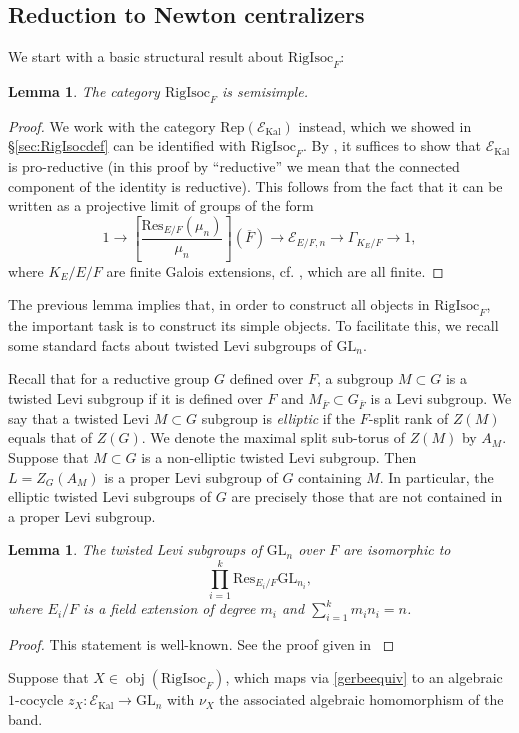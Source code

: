 \documentclass[11pt]{amsart}
\newtheorem{lem}[thm]{Lemma}
\theoremstyle{definition}
\newcommand{\mc}{\mathcal}
\newcommand{\ov}{\overline}
\newcommand{\Res}{\mathrm{Res}}
\newcommand{\RigIsoc}{\mathrm{RigIsoc}}
\newcommand{\GL}{\mathrm{GL}}
\DeclareMathOperator{\Kal}{Kal}
\DeclareMathOperator{\Ob}{obj}
\begin{document}
\subsection{Reduction to Newton centralizers}
We start with a basic structural result about $\RigIsoc_{F}$:
\begin{lem}
    The category $\RigIsoc_{F}$ is semisimple.
\end{lem}
\begin{proof}
    We work with the category $\text{Rep}(\mc{E}_{\text{Kal}})$ instead, which we showed in \S \ref{sec:RigIsocdef} can be identified with $\RigIsoc_{F}$. By \cite[Proposition 2.23]{DM82}, it suffices to show that $\mc{E}_{\text{Kal}}$ is pro-reductive (in this proof by ``reductive'' we mean that the connected component of the identity is reductive). This follows from the fact that it can be written as a projective limit of groups of the form 
    \begin{equation*}
        1 \to [\frac{\mathrm{Res}_{E/F}(\mu_{n})}{\mu_{n}}](\ov{F}) \to \mc{E}_{E/F,n} \to \Gamma_{K_{E}/F} \to 1,
    \end{equation*}
    where $K_{E}/E/F$ are finite Galois extensions, cf. \cite[\S 3.1]{Kalannals}, which are all finite.
\end{proof}
The previous lemma implies that, in order to construct all objects in $\RigIsoc_{F}$, the important task is to construct its simple objects. To facilitate this, we recall some standard facts about twisted Levi subgroups of $\GL_n$. 

Recall that for a reductive group $G$ defined over $F$, a subgroup $M \subset G$ is a twisted Levi subgroup if it is defined over $F$ and $M_{\ov{F}} \subset G_{\ov{F}}$ is a Levi subgroup. We say that a twisted Levi $M \subset G$ subgroup is \emph{elliptic} if the $F$-split rank of $Z(M)$ equals that of $Z(G)$. We denote the maximal split sub-torus of $Z(M)$ by $A_M$. Suppose that $M \subset G$ is a non-elliptic twisted Levi subgroup. Then $L=Z_{G}(A_M)$ is a proper Levi subgroup of $G$ containing $M$. In particular, the elliptic twisted Levi subgroups of $G$ are precisely those that are not contained in a proper Levi subgroup.

\begin{lem}{\label{lem: GLntwistedlevis}}
    The twisted Levi subgroups of $\GL_n$ over $F$ are isomorphic to
    \begin{equation*}
        \prod\limits_{i=1}^k \Res_{E_i/F} \GL_{n_i},
    \end{equation*}
    where $E_i/F$ is a field extension of degree $m_i$ and $\sum\limits_{i=1}^k m_in_i=n$.
\end{lem}
\begin{proof}
  This statement is well-known. See the proof given in \cite[Lemma 4.3.4]{FintzenSchwein}
\end{proof}
Suppose that $X \in \Ob(\RigIsoc_{F})$, which maps via \eqref{gerbeequiv} to an algebraic $1$-cocycle $z_X: \mc{E}_{\Kal} \rightarrow \GL_n$ with $\nu_X$ the associated algebraic homomorphism of the band. 
\end{document}
